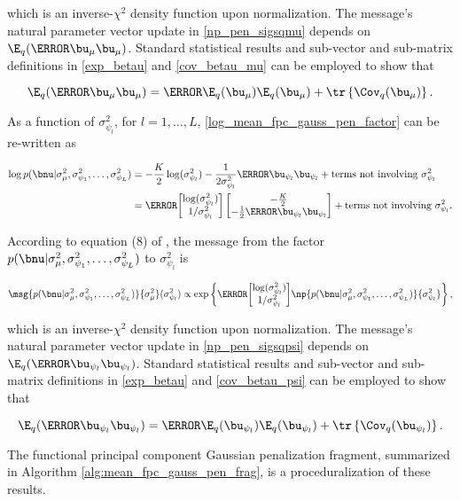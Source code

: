 \documentclass[12pt]{article}
\def\sigsqmu{\sigma^2_{\mu}}
\def\umu{\bu_\mu}
\newcommand\upsi[1]{\bu_{\psi_{#1}}}
\newcommand\sigsqpsi[1]{\sigma^2_{\psi_{#1}}}
\newcommand\tni[1]{\text{terms not involving $#1$}}
\theoremstyle{plain}
\theoremstyle{definition}
\theoremstyle{remark}
\begin{document}
\noindent which is an inverse-$\chi^2$
density function upon normalization. The message's natural parameter vector update in \eqref{np_pen_sigsqmu}
depends on $\E_q (\T{\umu} \umu)$. Standard statistical results and sub-vector and sub-matrix definitions in
\eqref{exp_betau} and \eqref{cov_betau_mu} can be employed to show that

\[
	\E_q (\T{\umu} \umu) = \T{\E_q (\umu)} \E_q (\umu) + \tr \left\{ \Cov_q (\umu) \right\}.
\]

As a function of $\sigsqpsi{l}$, for $l = 1, \dots, L$, \eqref{log_mean_fpc_gauss_pen_factor} can be re-written as

\begin{align*}
	\log p(\bnu | \sigsqmu, \sigsqpsi{1}, \dots, \sigsqpsi{L})
		& = -\frac{K}{2} \log (\sigsqpsi{l}) - \frac{1}{2\sigsqpsi{l}} \T{\upsi{l}} \upsi{l} + \tni{\sigsqpsi{l}} \\
		& = \T{\begin{bmatrix}
			\log (\sigsqpsi{l}) \\
			1/\sigsqpsi{l}
		\end{bmatrix}} \begin{bmatrix}
			-\frac{K}{2} \\
			-\frac12 \T{\upsi{l}} \upsi{l}
		\end{bmatrix} + \tni{\sigsqpsi{l}}.
\end{align*}

\noindent According to equation (8) of , the message from the factor $p(\bnu | \sigsqmu, \sigsqpsi{1}, \dots,
\sigsqpsi{L})$ to $\sigsqpsi{l}$ is

\[
	\msg{p (\bnu | \sigsqmu, \sigsqpsi{1}, \dots, \sigsqpsi{L})}{\sigsqmu} (\sigsqpsi{l})
		\propto
			\exp \left\{
				\T{\begin{bmatrix}
					\log (\sigsqpsi{l}) \\
					1/\sigsqpsi{l}
				\end{bmatrix}} 
				\np{p (\bnu | \sigsqmu, \sigsqpsi{1}, \dots, \sigsqpsi{L})}{\sigsqpsi{l}}
			\right\},
\]

\noindent which is an inverse-$\chi^2$
density function upon normalization. The message's natural parameter vector update in \eqref{np_pen_sigsqpsi}
depends on $\E_q (\T{\upsi{l}} \upsi{l})$. Standard statistical results and sub-vector and sub-matrix definitions in
\eqref{exp_betau} and \eqref{cov_betau_psi} can be employed to show that

\[
	\E_q (\T{\upsi{l}} \upsi{l}) = \T{\E_q (\upsi{l})} \E_q (\upsi{l}) + \tr \left\{ \Cov_q (\upsi{l}) \right\}.
\]

The functional principal component Gaussian penalization fragment, summarized in Algorithm \ref{alg:mean_fpc_gauss_pen_frag},
is a proceduralization of these results.



\end{document}
